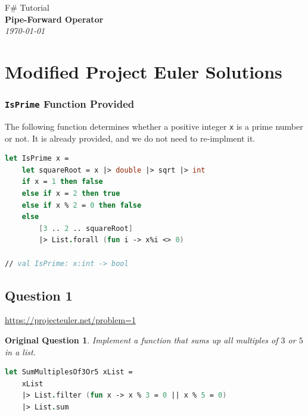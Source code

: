 \documentclass[12pt]{article}
\newtheorem*{origQuestion*}{Original Question}
\begin{document}
\begin{center}

{\large F\# Tutorial\\} \vspace{2mm}
\textbf{\LARGE Pipe-Forward Operator}\\
\vspace{1.5mm}
{\Large\emph{\today}}

\end{center}


\section{Modified Project Euler Solutions}

\subsubsection*{\texttt{IsPrime} Function Provided}
The following function determines whether a positive integer \texttt{x} is a prime number or not. It is already provided, and we do not need to re-implment it.
\begin{lstlisting}[language=FSharp]
let IsPrime x =
    let squareRoot = x |> double |> sqrt |> int 
    if x = 1 then false
    else if x = 2 then true
    else if x % 2 = 0 then false
    else 
        [3 .. 2 .. squareRoot]
        |> List.forall (fun i -> x%i <> 0)

// val IsPrime: x:int -> bool
\end{lstlisting}

\subsection*{Question 1} 

\url{https://projecteuler.net/problem=1}

\begin{origQuestion*}
Implement a function that sums up all multiples of $3$ or $5$ in a list.
\end{origQuestion*}

\begin{lstlisting}[language=FSharp]
let SumMultiplesOf3Or5 xList =
    xList
    |> List.filter (fun x -> x % 3 = 0 || x % 5 = 0)
    |> List.sum
\end{lstlisting}
\pagebreak
\end{document}
